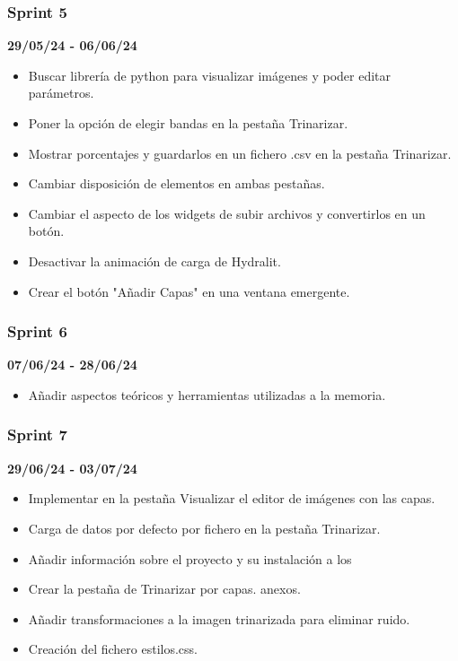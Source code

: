 \subsubsection{Sprint 5}
\textbf{29/05/24 - 06/06/24}
\begin{itemize}
    \item Buscar librería de python para visualizar imágenes y poder editar parámetros.
    \item Poner la opción de elegir bandas en la pestaña Trinarizar.
    \item Mostrar porcentajes y guardarlos en un fichero .csv en la pestaña Trinarizar.
    \item Cambiar disposición de elementos en ambas pestañas.
    \item Cambiar el aspecto de los widgets de subir archivos y convertirlos en un botón.
    \item Desactivar la animación de carga de Hydralit.
    \item Crear el botón "Añadir Capas" en una ventana emergente.
\end{itemize}

\subsubsection{Sprint 6}
\textbf{07/06/24 - 28/06/24}
\begin{itemize}
    \item Añadir aspectos teóricos y herramientas utilizadas a la memoria.
\end{itemize}

\subsubsection{Sprint 7}
\textbf{29/06/24 - 03/07/24}
\begin{itemize}
    \item Implementar en la pestaña Visualizar el editor de imágenes con las capas.
    \item Carga de datos por defecto por fichero en la pestaña Trinarizar.
    \item Añadir información sobre el proyecto y su instalación a los 
    \item Crear la pestaña de Trinarizar por capas.
    anexos.
    \item Añadir transformaciones a la imagen trinarizada para eliminar ruido.
    \item Creación del fichero estilos.css.

\end{itemize}

